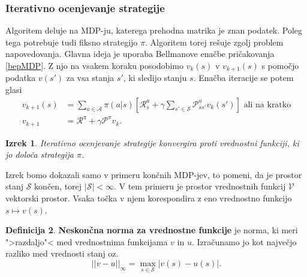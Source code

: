 \documentclass[12pt,a4paper]{amsart}
\theoremstyle{definition} %
\newtheorem{definicija}{Definicija}[section]
\theoremstyle{plain} %
\newtheorem{izrek}[definicija]{Izrek}
\begin{document}
\subsubsection{Iterativno ocenjevanje strategije}
Algoritem deluje na MDP-ju, katerega prehodna matrika je znan podatek. Poleg tega potrebuje tudi 
fiksno strategijo $\pi$. Algoritem torej rešuje zgolj problem napovedovanja. Glavna ideja je uporaba 
Bellmanove enačbe pričakovanja \eqref{bepMDP}. Z njo na vsakem koraku posodobimo $v_k(s)$ v 
$v_{k+1}(s)$ s pomočjo podatka $v(s')$ za vsa stanja $s'$, ki sledijo stanju $s$. Enačba iteracije se 
potem glasi 
\begin{align*}
    v_{k+1}(s) &= \sum_{a \in \mathcal{A}} \pi(a|s) \left[ \mathcal{R}_s^a + 
        \gamma \sum_{s' \in \mathcal{S}} \mathcal{P}_{ss'}^a v_k(s') \right] \text{ ali na kratko}\\
    v_{k+1} &= \mathcal{R}^\pi + \gamma \mathcal{P}^\pi v_k.
\end{align*}

\begin{izrek}\label{ios}
    Iterativno ocenjevanje strategije konvergira proti vrednostni funkciji, ki jo določa strategija 
    $\pi$.
\end{izrek}

Izrek bomo dokazali samo v primeru končnih MDP-jev, to pomeni, da je prostor stanj $\mathcal{S}$ 
končen, torej $|\mathcal{S}| < \infty$. V tem primeru je prostor vrednostnih funkcij $\mathcal{V}$
vektorski prostor. Vsaka točka v njem korespondira z eno vrednostno funkcijo $s \mapsto v(s)$.

\begin{definicija}
    \textbf{Neskončna norma za vrednostne funkcije} je norma, ki meri ">razdaljo"< med vrednostnima 
    funkcijama $v$ in $u$. Izračunamo jo kot največjo razliko med vrednosti stanj oz. 
    $$
    ||v - u||_\infty = \max_{s \in \mathcal{S}} |v(s) - u(s)|.
    $$
\end{definicija}
\end{document}
